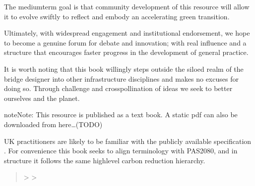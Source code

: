 \documentclass[letterpaper,10pt,english]{jupyterBook}
\begin{document}
\sphinxAtStartPar
The medium\sphinxhyphen{}term goal is that community development of this resource will allow it to evolve swiftly to reflect and embody an accelerating green transition.

\sphinxAtStartPar
Ultimately, with widespread engagement and institutional endorsement, we hope to become a genuine forum for debate and innovation;  with real influence and a structure that encourages faster progress in the development of general practice.

\sphinxAtStartPar
It is worth noting that this book willingly steps outside the siloed realm of the bridge designer into other infrastructure disciplines and makes no excuses for doing so. Through challenge and cross\sphinxhyphen{}pollination of ideas we seek to better ourselves and the planet.

\begin{sphinxadmonition}{note}{Note:}
\sphinxAtStartPar
This resource is published as a  text book. A static pdf can also be downloaded from here…(TODO)
\end{sphinxadmonition}

\sphinxAtStartPar
UK practitioners are likely to be familiar with the publicly available specification {\hyperref[\detokenize{part5/glossary:term-PAS2080-2023}]{}} . For convenience this book seeks to align terminology with PAS2080, and in structure it follows the same high\sphinxhyphen{}level carbon reduction hierarchy.
\begin{quote}

\sphinxAtStartPar
{\hyperref[\detokenize{part1/intro_avoid::doc}]{}} \sphinxhyphen{}> {\hyperref[\detokenize{part2/intro_switch::doc}]{}} \sphinxhyphen{}> {\hyperref[\detokenize{part3/intro_improve::doc}]{}}
\end{quote}
\end{document}
